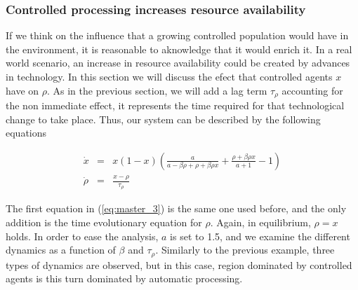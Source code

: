 \documentclass[10pt,a4paper]{article}
\begin{document}
\subsubsection{Controlled processing increases resource availability}

If we think on the influence that a growing controlled population would have in the environment, it is reasonable to aknowledge that it would enrich it.
In a real world scenario, an increase in resource availability could be created by advances in technology. In this section we will discuss the efect that
controlled agents $x$ have on $\rho$. As in the previous section, we will add a lag term $\tau_{\rho}$ accounting for the non immediate effect, it represents
the time required for that technological change to take place. Thus, our system can be described by the following equations

\begin{equation}
\begin{array}{lcl}
\dot{x} & = & x(1-x)\displaystyle\left( \frac{a}{a-\beta\rho+\rho+\beta\rho x} + \frac{\rho+\beta\rho x}{a+1} -1 \right)\\
\dot{\rho} & = & \displaystyle\frac{x-\rho}{\tau_{\rho}}
\end{array}
\label{eq:master_3}
\end{equation}

The first equation in (\ref{eq:master_3}) is the same one used before, and the only addition is the time evolutionary equation for $\rho$. Again, in equilibrium,
$\rho = x$ holds. In order to ease the analysis, $a$ is set to 1.5, and we examine the different dynamics as a function of $\beta$ and $\tau_{\rho}$. Similarly to the previous 
example, three types of dynamics are observed, but in this case, region dominated by controlled agents is this turn dominated by automatic processing. 
\end{document}
